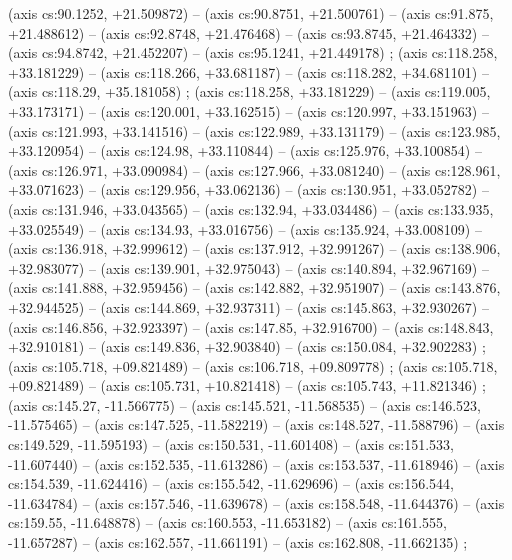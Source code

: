     (axis cs:90.1252,    +21.509872) --  (axis cs:90.8751,    +21.500761) --  (axis cs:91.875,    +21.488612) --  (axis cs:92.8748,    +21.476468) --  (axis cs:93.8745,    +21.464332) --  (axis cs:94.8742,    +21.452207) --  (axis cs:95.1241,    +21.449178) ;
    (axis cs:118.258,    +33.181229) --  (axis cs:118.266,    +33.681187) --  (axis cs:118.282,    +34.681101) --  (axis cs:118.29,    +35.181058) ;
    (axis cs:118.258,    +33.181229) --  (axis cs:119.005,    +33.173171) --  (axis cs:120.001,    +33.162515) --  (axis cs:120.997,    +33.151963) --  (axis cs:121.993,    +33.141516) --  (axis cs:122.989,    +33.131179) --  (axis cs:123.985,    +33.120954) --  (axis cs:124.98,    +33.110844) --  (axis cs:125.976,    +33.100854) --  (axis cs:126.971,    +33.090984) --  (axis cs:127.966,    +33.081240) --  (axis cs:128.961,    +33.071623) --  (axis cs:129.956,    +33.062136) --  (axis cs:130.951,    +33.052782) --  (axis cs:131.946,    +33.043565) --  (axis cs:132.94,    +33.034486) --  (axis cs:133.935,    +33.025549) --  (axis cs:134.93,    +33.016756) --  (axis cs:135.924,    +33.008109) --  (axis cs:136.918,    +32.999612) --  (axis cs:137.912,    +32.991267) --  (axis cs:138.906,    +32.983077) --  (axis cs:139.901,    +32.975043) --  (axis cs:140.894,    +32.967169) --  (axis cs:141.888,    +32.959456) --  (axis cs:142.882,    +32.951907) --  (axis cs:143.876,    +32.944525) --  (axis cs:144.869,    +32.937311) --  (axis cs:145.863,    +32.930267) --  (axis cs:146.856,    +32.923397) --  (axis cs:147.85,    +32.916700) --  (axis cs:148.843,    +32.910181) --  (axis cs:149.836,    +32.903840) --  (axis cs:150.084,    +32.902283) ;
    (axis cs:105.718,    +09.821489) --  (axis cs:106.718,    +09.809778) ;
    (axis cs:105.718,    +09.821489) --  (axis cs:105.731,    +10.821418) --  (axis cs:105.743,    +11.821346) ;
    (axis cs:145.27,    -11.566775) --  (axis cs:145.521,    -11.568535) --  (axis cs:146.523,    -11.575465) --  (axis cs:147.525,    -11.582219) --  (axis cs:148.527,    -11.588796) --  (axis cs:149.529,    -11.595193) --  (axis cs:150.531,    -11.601408) --  (axis cs:151.533,    -11.607440) --  (axis cs:152.535,    -11.613286) --  (axis cs:153.537,    -11.618946) --  (axis cs:154.539,    -11.624416) --  (axis cs:155.542,    -11.629696) --  (axis cs:156.544,    -11.634784) --  (axis cs:157.546,    -11.639678) --  (axis cs:158.548,    -11.644376) --  (axis cs:159.55,    -11.648878) --  (axis cs:160.553,    -11.653182) --  (axis cs:161.555,    -11.657287) --  (axis cs:162.557,    -11.661191) --  (axis cs:162.808,    -11.662135) ;

